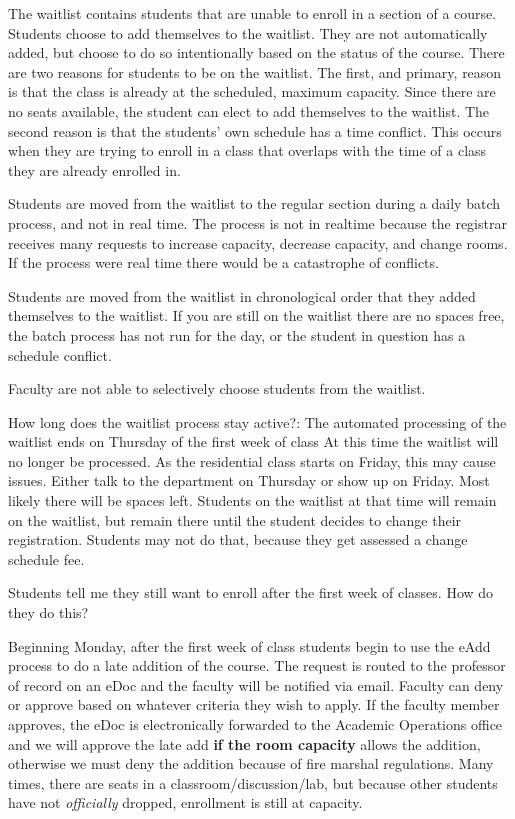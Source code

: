 The waitlist contains students that are unable to enroll in a section of
a course. Students choose to add themselves to the waitlist. They are
not automatically added, but choose to do so intentionally based on the
status of the course. There are two reasons for students to be on the
waitlist. The first, and primary, reason is that the class is already at
the scheduled, maximum capacity. Since there are no seats available, the
student can elect to add themselves to the waitlist. The second reason
is that the students' own schedule has a time conflict. This occurs when
they are trying to enroll in a class that overlaps with the time of a
class they are already enrolled in.

Students are moved from the waitlist to the regular section during a
daily batch process, and not in real time. The process is not in
realtime because the registrar receives many requests to increase
capacity, decrease capacity, and change rooms. If the process were real
time there would be a catastrophe of conflicts.

Students are moved from the waitlist in chronological order that they
added themselves to the waitlist. If you are still on the waitlist there
are no spaces free, the batch process has not run for the day, or the
student in question has a schedule conflict.

Faculty are not able to selectively choose students from the waitlist.

How long does the waitlist process stay active?: The automated
processing of the waitlist ends on Thursday of the first week of class
At this time the waitlist will no longer be processed.  As the
residential class starts on Friday, this may cause issues. Either talk
to the department on Thursday or show up on Friday. Most likely there
will be spaces left.  Students on the waitlist at that time will
remain on the waitlist, but remain there until the student decides to
change their registration. Students may not do that, because they get
assessed a change schedule fee.

Students tell me they still want to enroll after the first week of
classes. How do they do this?

Beginning Monday, after the first week of class students begin to use
the eAdd process to do a late addition of the course. The request is
routed to the professor of record on an eDoc and the faculty will be
notified via email. Faculty can deny or approve based on whatever
criteria they wish to apply. If the faculty member approves, the eDoc
is electronically forwarded to the Academic Operations office and we
will approve the late add \textbf{if the room capacity} allows the
addition, otherwise we must deny the addition because of fire marshal
regulations. Many times, there are seats in a
classroom/discussion/lab, but because other students have not
\emph{officially} dropped, enrollment is still at capacity.

